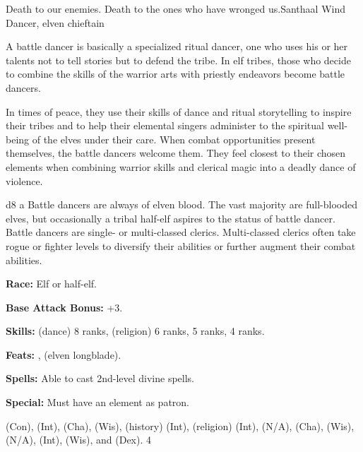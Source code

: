 {Death to our enemies. Death to the ones who have wronged us.}{Santhaal Wind Dancer, elven chieftain}
{A battle dancer is basically a specialized ritual dancer, one who uses his or her talents not to tell stories but to defend the tribe. In elf tribes, those who decide to combine the skills of the warrior arts with priestly endeavors become battle dancers.

In times of peace, they use their skills of dance and ritual storytelling to inspire their tribes and to help their elemental singers administer to the spiritual well-being of the elves under their care. When combat opportunities present themselves, the battle dancers welcome them. They feel closest to their chosen elements when combining warrior skills and clerical magic into a deadly dance of violence.}
{d8}
{a}
{Battle dancers are always of elven blood. The vast majority are full-blooded elves, but occasionally a tribal half-elf aspires to the status of battle dancer. Battle dancers are single- or multi-classed clerics. Multi-classed clerics often take rogue or fighter levels to diversify their abilities or further augment their combat abilities.}
{
\textbf{Race:} Elf or half-elf.

\textbf{Base Attack Bonus:} +3.

\textbf{Skills:}  (dance) 8 ranks,  (religion) 6 ranks,  5 ranks,  4 ranks.

\textbf{Feats:} ,  (elven longblade).

\textbf{Spells:} Able to cast 2nd-level divine spells.

\textbf{Special:} Must have an element as patron.
}
{ (Con),  (Int),  (Cha),  (Wis),  (history) (Int),  (religion) (Int),  (N/A),  (Cha),  (Wis),  (N/A),  (Int),  (Wis), and  (Dex).}
{4}
